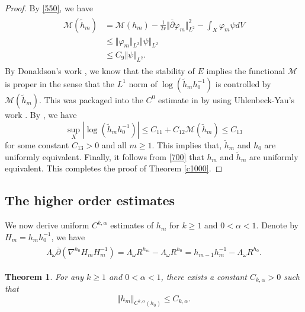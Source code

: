 \documentclass[11pt]{amsart}
\newtheorem{theorem}{Theorem}[section]
\numberwithin{equation}{section}
\theoremstyle{remark}
\renewcommand{\bar}{\overline}
\newcommand{\pa}{\partial}
\renewcommand{\phi}{\varphi}
\newcommand{\wt}{\widetilde}
\newcommand{\M}{{\mathcal M}}
\newcommand{\lb}{\left (}
\newcommand{\rb}{\right )}
\newcommand{\ga}{\alpha}
\begin{document}
\begin{proof}
By \eqref{550}, we have
\begin{align*}
\begin{split}
\M(\wt h_m) & =\M\lb h_m\rb-\frac{1}{2r}\Vert\bar\pa\phi_m\Vert_{L^2}^2 -\int_X \phi_m\psi dV\\
& \leq \Vert \phi_m\Vert_{L^2} \Vert \psi\Vert_{L^2}\\
& \leq C_9\Vert \psi\Vert_{L^2}.
\end{split}
\end{align*}
By Donaldson's work \cite{sd1, sd2}, we know that the stability of $E$ implies the functional $\M$ is proper in the sense that the $L^1$ norm of $\log\lb \wt h_mh_0^{-1}\rb$ is controlled by $\M\lb\wt h_m\rb$. This was packaged into the $C^0$ estimate in \cite{sim1988} by using Uhlenbeck-Yau's work \cite{UY}. By \cite[Proposition 5.3]{sim1988}, we have
\[
\sup_X \left |\log\lb \wt h_mh_0^{-1}\rb\right | \leq C_{11}+C_{12}\M\lb \wt h_m\rb\leq C_{13}
\]
for some constant $C_{13}>0$ and all $m\geq 1$.
This implies that, $\wt h_m$ and $h_0$ are uniformly equivalent. Finally, it follows from \eqref{700} that $h_m$ and $\wt h_m$ are uniformly equivalent. This completes the proof of   Theorem \ref{c1000}.





\end{proof}



\subsection{The higher order estimates}

We now derive uniform $C^{k,\ga}$ estimates of $h_m$ for $k\geq 1$ and $0<\ga<1$.  Denote by  $H_m=h_mh_0^{-1}$,  we have
\begin{align}\label{800}
\begin{split}
\Lambda_\omega \bar\pa \lb \nabla^{h_0}H_m H_m^{-1}\rb=\Lambda_\omega R^{h_m}-\Lambda_\omega R^{h_0}=h_{m-1}h_m^{-1}-\Lambda_\omega R^{h_0}.
\end{split}
\end{align}

\begin{theorem}\label{c2000}
For any $k\geq 1$ and $0<\ga<1$,  there exists a constant $C_{k,\ga}>0$ such that
\[
\Vert h_m\Vert_{C^{k,\ga}\lb h_0\rb}\leq C_{k,\ga}.
\]
\end{theorem}
\end{document}
